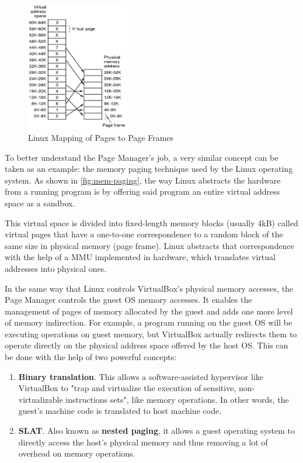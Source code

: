 \begin{figure}[htbp]
	\centering
	\includegraphics[width=0.40\textwidth,keepaspectratio]{art/mem-paging.png}
	\caption{Linux Mapping of Pages to Page Frames \cite{misc:mem-paging}}
	\label{fig:mem-paging}
\end{figure}
To better understand the Page Manager's job, a very similar concept can be taken as an example: the memory paging technique used by the Linux operating system. As shown in \autoref{fig:mem-paging}, the way Linux abstracts the hardware from a running program is by offering said program an entire virtual address space as a sandbox. 

This virtual space is divided into fixed-length memory blocks (usually 4kB) called virtual pages that have a one-to-one correspondence to a random block of the same size in physical memory (page frame). Linux abstracts that correspondence with the help of a \gls{MMU} implemented in hardware, which translates virtual addresses into physical ones.

In the same way that Linux controls VirtualBox's physical memory accesses, the Page Manager controls the guest OS memory accesses. It enables the management of pages of memory allocated by the guest and adds one more level of memory indirection. For example, a program running on the guest OS will be executing operations on guest memory, but VirtualBox actually redirects them to operate directly on the physical address space offered by the host OS. This can be done with the help of two powerful concepts:
\begin{enumerate}
	\item \textbf{Binary translation}. This allows a software-assisted hypervisor like VirtualBox to "trap and virtualize the execution of sensitive, non-virtualizable instructions sets"\cite{online:virtualization}, like memory operations. In other words, the guest's machine code is translated to host machine code.
	\item \textbf{\gls{SLAT}}. Also known as \textbf{nested paging}, it allows a guest operating system to directly access the host's physical memory and thus removing a lot of overhead on memory operations.
\end{enumerate} 

